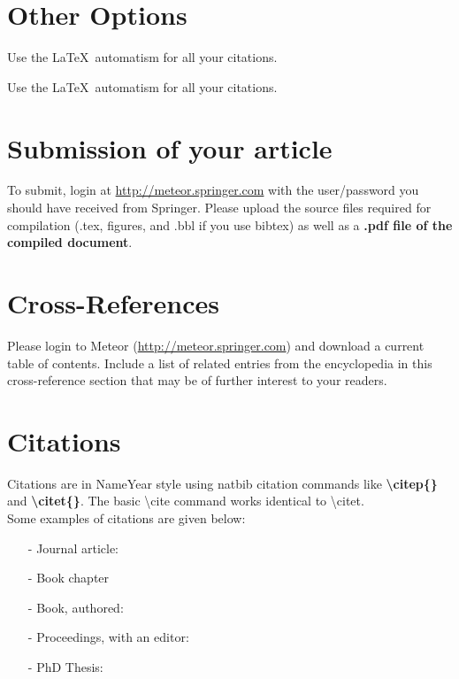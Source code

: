 \documentclass[graybox, natbib, nosecnum, twocolumn]{svmult}
\begin{document}
{\section{Other Options}
 Use the \LaTeX\ automatism for all your citations.

 Use the \LaTeX\ automatism for all your citations.

\section{Submission of your article} To submit, login at \url{http://meteor.springer.com} with the user/password you should have received from Springer. Please upload the source files required for compilation (.tex, figures, and .bbl if you use bibtex) as well as a {\bf .pdf file of the compiled document}.

\section{Cross-References}
Please login to Meteor (\url{http://meteor.springer.com}) and download a current table of contents. Include a list of related entries from the encyclopedia in this cross-reference section that may be of further interest to your readers. 
\section{Citations}
Citations are in NameYear style using natbib citation commands like {\bf \textbackslash citep\{\}} and {\bf \textbackslash citet\{\}}. The basic \textbackslash cite command works identical to \textbackslash citet. \\
Some examples of citations are given below:

\begin{itemize}
\item[-]{Journal article: \citep{Smith99}}
\item[-]{Book chapter \citep{Aron01} }
\item[-]{Book, authored: \citep{Brown01}  }
\item[-]{Proceedings, with an editor:  \citep{Boisnard06}  }
\item[-]{PhD Thesis: \citep{AlmenaraThesis10} } 
\end{itemize}
}


\end{document}

